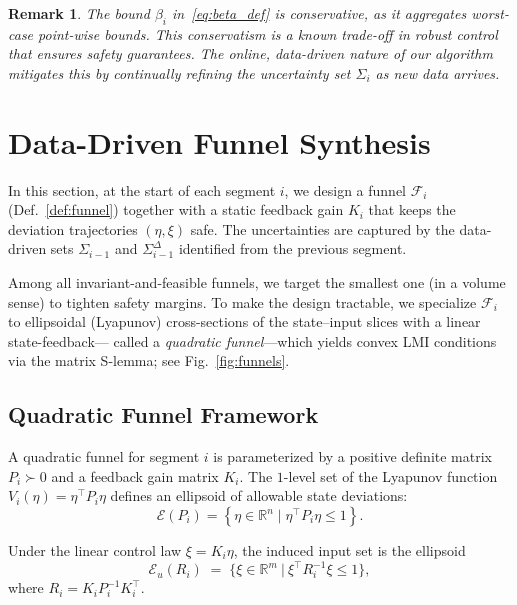 \documentclass[letterpaper, 10 pt, conference]{ieeeconf}
\newcommand{\R}{\mathbb{R}}
\newtheorem{remark}{Remark}
\begin{document}
\begin{remark}\label{rem:beta_conservative}
The bound $\beta_i$ in~\eqref{eq:beta_def} is conservative,  as it aggregates worst-case point-wise bounds. This conservatism is a known trade-off in robust control that ensures safety guarantees. The online, data-driven nature of our algorithm mitigates this by continually refining the uncertainty set $\Sigma_i$ as new data arrives.
\end{remark}


\section{Data-Driven Funnel Synthesis}
\label{sec:data_driven_funnel}

In this section, at the start of each segment $i$, we design a funnel $\mathcal{F}_i$ (Def.~\ref{def:funnel}) together with a static feedback gain $K_i$ that keeps the deviation trajectories $(\eta,\xi)$ safe. The uncertainties are captured by the data-driven sets $\Sigma_{i-1}$ and $\Sigma_{i-1}^\Delta$ identified from the previous segment. 

Among all invariant-and-feasible funnels, we target the smallest one (in a volume sense) to tighten safety margins. To make the design tractable, we specialize $\mathcal{F}_i$ to ellipsoidal (Lyapunov) cross-sections of the state–input slices with a linear state-feedback— called a \emph{quadratic funnel}—which yields convex LMI conditions via the matrix S-lemma; see Fig.~\ref{fig:funnels}.

\subsection{Quadratic Funnel Framework}
\label{subsec:funnel_framework}
A quadratic funnel for segment $i$ is parameterized by a positive definite matrix $P_i \succ 0$ and a feedback gain matrix $K_i$. The $1$-level set of the Lyapunov function $V_i(\eta) = \eta^\top P_i \eta$ defines an ellipsoid of allowable state deviations:
\begin{equation}
\mathcal{E}(P_i) = \left\{ \eta \in \R^n \mid \eta^\top P_i \eta \le 1 \right\}.
\end{equation}

Under the linear control law $\xi = K_i \eta$, the induced input set is the ellipsoid
\[
\mathcal{E}_u(R_i) \;=\; \big\{ \xi \in \R^m \ \big|\ \xi^\top R_i^{-1} \xi \le 1 \big\},
\]
where $R_i = K_i P_i^{-1} K_i^\top$.
\end{document}
